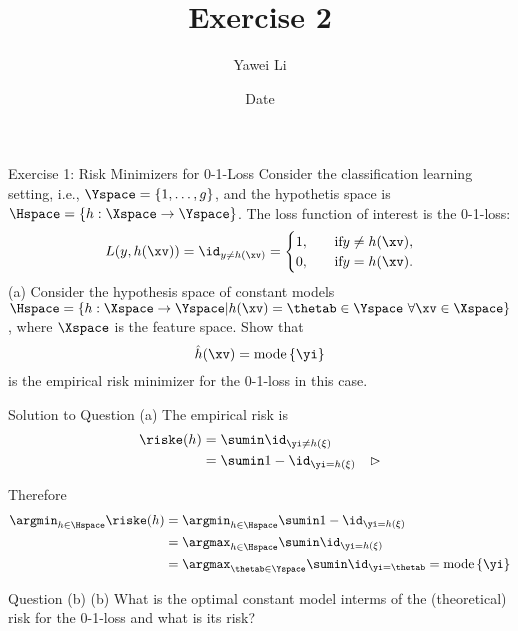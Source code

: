 \documentclass[aspectratio=169]{beamer}
\title[]{\textbf{Exercise 2}}
\author{Yawei Li}
\institute[LMU]
{
\\
  \texttt{yawei.li@stat.uni-muenchen.de}
}
\date{Date}
\begin{document}
\begin{frame}
\titlepage

\end{frame}


\begin{frame}{Exercise 1: Risk Minimizers for 0-1-Loss}
	Consider the classification learning setting, i.e., $\Yspace = \{1, \ldots, g\}$, and the hypothetis space is $\Hspace = \{h: \Xspace \rightarrow \Yspace \}$. The loss function of interest is the 0-1-loss:
	$$L(y, h(\xv)) = \id_{y \neq h(\xv)} = \begin{cases}
		1, \quad &\text{if} y \neq h(\xv), \\
		0, \quad &\text{if} y = h(\xv).
	\end{cases}
	$$
	(a) Consider the hypothesis space of constant models $\Hspace = \{h: \Xspace \rightarrow \Yspace | h(\xv) = \thetab \in \Yspace \ \forall \xv \in \Xspace \}$, where $\Xspace$ is the feature space. Show that 
	$$
		\hat{h}(\xv) = \mathrm{mode} \left\{\yi \right\}
	$$
	is the empirical risk minimizer for the 0-1-loss in this case.
\end{frame}

\begin{frame}{Solution to Question (a)}
\small
The empirical risk is
	\begin{align*}
		\riske(h) &= \sumin \id_{\yi \neq h(\xi)} \\
		&=\sumin 1 - \id_{\yi = h(\xi)} \quad \rhd \\
	\end{align*}

Therefore
\begin{align*}
	\argmin_{h \in \Hspace} \riske(h) 
	&= \argmin_{h \in \Hspace} \sumin 1 - \id_{\yi = h(\xi)} \\ 
	&= \argmax_{h \in \Hspace} \sumin \id_{\yi = h(\xi)} \\
	&= \argmax_{\thetab \in \Yspace} \sumin \id_{\yi = \thetab} =\mathrm{mode} \left\{ \yi \right\}
\end{align*}
	
\end{frame}

\begin{frame}{Question (b)}
	(b) What is the optimal constant model interms of the (theoretical) risk for the 0-1-loss and what is its risk?
\end{frame}
\end{document}
